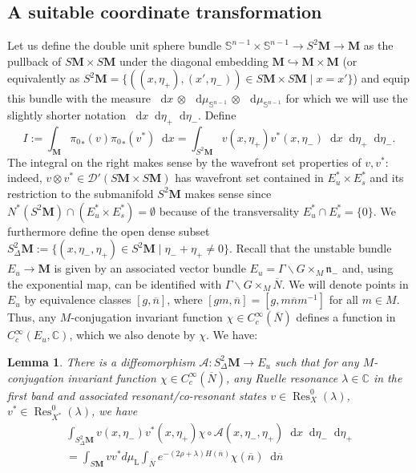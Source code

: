 \documentclass[10pt]{amsart}
\newtheorem{lemm}[cdrthm]{Lemma}
\theoremstyle{definition}
\DeclareMathOperator{\Res}{Res}
\newcommand{\rml}{\mathrm{L}}
\newcommand{\mc}{\mathcal}
\newcommand{\cc}{\mathbb{C}}
\newcommand{\bfm}{\mathbf{M}}
\newcommand{\x}{\times}
\newcommand{\intd}{\mathop{}\!\mathrm{d}}
\newcommand{\n}{\mathfrak n}
\newcommand{\bn}{{\overline{n}}}
\newcommand{\bN}{{\overline{N}}}
\begin{document}
\subsection{A suitable coordinate transformation}

Let us define the double unit sphere bundle $\mathbb S^ {n-1}\times \mathbb S^ {n-1}\to S^2\mathbf{M}\to \mathbf M$ as the pullback of $S\mathbf M\times S\mathbf M$ under the diagonal embedding $\mathbf M \hookrightarrow \mathbf M\times\mathbf M$ (or equivalently as $S^2\bfm=\{((x,\eta_+),(x',\eta_-))\in S{\bfm}\x S{\bfm}\mid x=x'\}$) and equip this bundle with the measure $\intd x\,\otimes\,\intd{\mu}_{\mathbb S^{n-1}}\,\otimes\,\intd{\mu}_{\mathbb S^{n-1}}$ for which we will use the slightly shorter notation $\intd x\intd \eta_+\intd\eta_-$. Define
\[
I:=\int_{\mathbf M} {\pi_0}_*(v) {\pi_0}_*(v^*) \intd x = \int_{S^2\mathbf M} v(x,\eta_+)v^*(x,\eta_-) \intd x\intd \eta_+\intd\eta_-.
\]
The integral on the right makes sense by the wavefront set properties of $v,v^*$: indeed, $v\otimes v^*\in \mc{D}'(S{\bfm}\x S{\bfm})$ has wavefront set contained in $E_u^* \x E_s^*$ and its restriction to the submanifold $S^2{\bfm}$ makes sense since $N^*(S^2{\bfm})\cap (E_u^* \x E_s^*)=\emptyset$ because of the transversality $E_u^*\cap E_s^*=\{0\}$. We furthermore define the open dense subset $S^2_\Delta\mathbf M := \{(x,\eta_-,\eta_+)\in S^2\mathbf M \mid \eta_-+\eta_+ \neq 0\}$. Recall that the unstable bundle $E_u\to\mathbf M$ is given by an associated vector bundle $E_u = \Gamma\backslash G\times_M\n_-$ and, using the exponential map, can be identified with $\Gamma\backslash G\times_M\bN$. We will denote points in $E_u$ by equivalence classes $[g,\overline n]$, where $[gm,\bn]= [g,m\bn m^{-1}]$ for all $m\in M$. Thus, any $M$-conjugation invariant function $\chi\in C_c^\infty(\bN)$ defines a function in $C_c^\infty(E_u,\cc)$, which we also denote by $\chi$. We have:

\begin{lemm}\label{lem:pairing_coordinate}
There is a diffeomorphism $\mathcal A :S^{2}_\Delta \mathbf M \to E_u$ such that for any $M$-conjugation invariant function $\chi\in C_c^\infty(\bN)$, any Ruelle resonance $\lambda\in\cc$ in the first band and associated resonant/co-resonant states $v\in \Res^0_X(\lambda)$, $v^ *\in \Res^0_{X^*}(\lambda)$, we have
\begin{multline}\label{eq:pairing_coordinate}
\int_{S^2_\Delta \mathbf M} v(x,\eta_-)v^*(x,\eta_+)\chi\circ\mathcal A (x,\eta_-,\eta_+)\intd x\intd \eta_- \intd \eta_+ \\
=\int_{S\mathbf M} v v^*d\mu_{\rml}\int_{\bN} e^{-(2\rho+\lambda)H(\bn)}\chi(\bn) \intd \bn
\end{multline}
\end{lemm}
\end{document}
